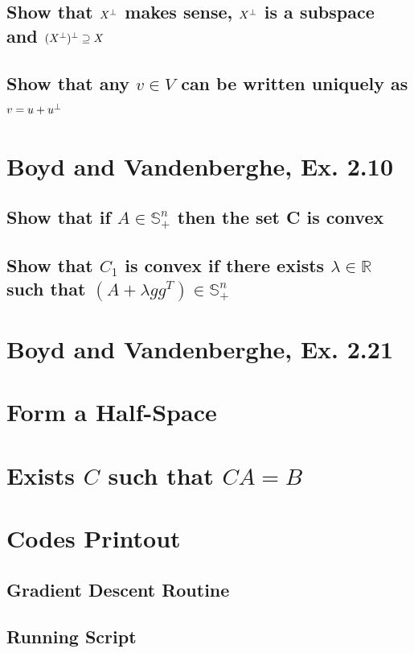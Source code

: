 \documentclass[11pt,a4paper]{article}
\begin{document}
\newpage
\subsection{Show that $X^{\perp}$ makes sense, $X^{\perp}$ is a subspace and
    $(X^{\perp})^{\perp} \supseteq X$}

\subsection{Show that any $v \in V$ can be written uniquely as $v = u + u^{\perp}$} 

\newpage
\section{Boyd and Vandenberghe, Ex. 2.10}
\newcommand{\Snp}{\ensuremath{\mathbb{S}_{+}^{n}}}
\subsection{Show that if $A \in \Snp$ then the set C is
    convex}

\subsection{Show that $C_1$ is convex if there exists $\lambda \in
    \mathbb{R}$ such that $(A + \lambda gg^T) \in \Snp$}

\newpage
\section{Boyd and Vandenberghe, Ex. 2.21}

\newpage
\setcounter{section}{6}
\section{Form a Half-Space}

\newpage
\setcounter{section}{7}
\section{Exists $C$ such that $CA = B$}

\newpage
\appendix
\section{Codes Printout}

\subsection{Gradient Descent Routine}

\newpage

\subsection{Running Script}


\end{document}
